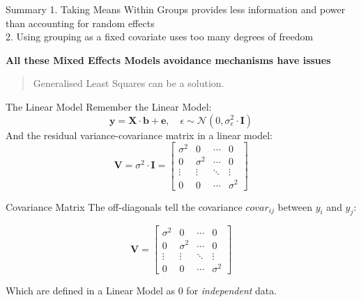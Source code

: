 \documentclass{beamer}
\begin{document}
\begin{frame}{Summary}
1. Taking Means Within Groups provides less information and power than accounting for random effects\\
2. Using grouping as a fixed covariate uses too many degrees of freedom \\
\vspace{0.5cm}

\large\textbf{All these Mixed Effects Models avoidance mechanisms have issues}
\vspace{0.5cm}

  \begin{quote}
    Generalised Least Squares can be a solution.
  \end{quote}
\end{frame}

\begin{frame}{The Linear Model}
  Remember the Linear Model:
  \[
  \mathbf{y} = \mathbf{X} \cdot \mathbf{b} + \mathbf{e}, \quad \epsilon \sim \mathcal{N}(0, \sigma^2_{e} \cdot \mathbf{I})
  \]
  And the residual variance-covariance matrix in a linear model:
  \[
  \mathbf{V} = \sigma^2 \cdot \mathbf{I} = 
  \begin{bmatrix}
  \sigma^2 & 0 & \cdots & 0 \\
  0 & \sigma^2 & \cdots & 0 \\
  \vdots & \vdots & \ddots & \vdots \\
  0 & 0 & \cdots & \sigma^2
  \end{bmatrix}
  \]
\end{frame}

\begin{frame}{Covariance Matrix}
  \centering
  The off-diagonals tell the covariance $covar_{ij}$ between $y_i$ and $y_j$:
  \vspace{0.5cm}

  \[
  \mathbf{V} = 
  \begin{bmatrix}
  \sigma^2 & 0 & \cdots & 0 \\
  0 & \sigma^2 & \cdots & 0 \\
  \vdots & \vdots & \ddots & \vdots \\
  0 & 0 & \cdots & \sigma^2
  \end{bmatrix}
  \]
  \vspace{0.5cm}
  
  Which are defined in a Linear Model as $0$ for \textit{independent} data.
\end{frame}
\end{document}
